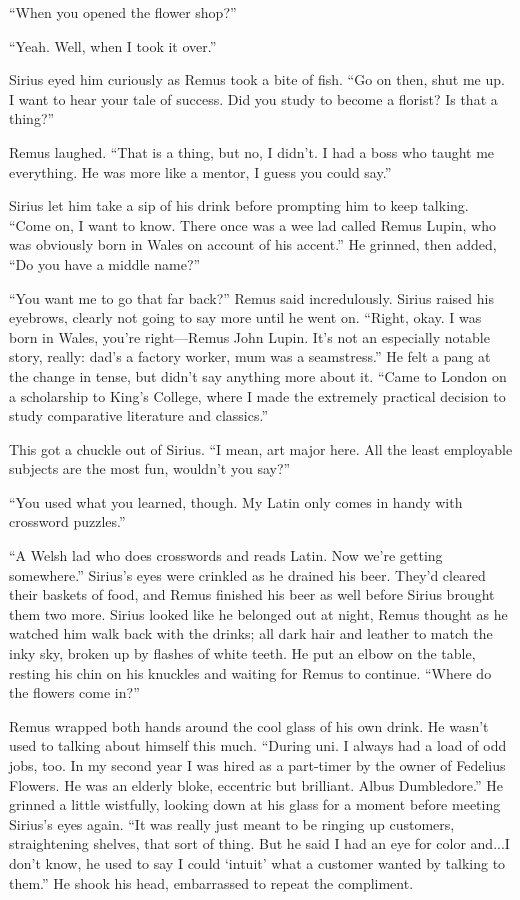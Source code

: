 “When you opened the flower shop?”

“Yeah. Well, when I took it over.”

Sirius eyed him curiously as Remus took a bite of fish. “Go on then, shut me up. I want to hear your tale of success. Did you study to become a florist? Is that a thing?”

Remus laughed. “That is a thing, but no, I didn’t. I had a boss who taught me everything. He was more like a mentor, I guess you could say.”

Sirius let him take a sip of his drink before prompting him to keep talking. “Come on, I want to know. There once was a wee lad called Remus Lupin, who was obviously born in Wales on account of his accent.” He grinned, then added, “Do you have a middle name?”

“You want me to go that far back?” Remus said incredulously. Sirius raised his eyebrows, clearly not going to say more until he went on. “Right, okay. I was born in Wales, you’re right—Remus John Lupin. It’s not an especially notable story, really: dad’s a factory worker, mum was a seamstress.” He felt a pang at the change in tense, but didn’t say anything more about it. “Came to London on a scholarship to King’s College, where I made the extremely practical decision to study comparative literature and classics.”

This got a chuckle out of Sirius. “I mean, art major here. All the least employable subjects are the most fun, wouldn’t you say?”

“You used what you learned, though. My Latin only comes in handy with crossword puzzles.”

“A Welsh lad who does crosswords and reads Latin. Now we’re getting somewhere.” Sirius’s eyes were crinkled as he drained his beer. They’d cleared their baskets of food, and Remus finished his beer as well before Sirius brought them two more. Sirius looked like he belonged out at night, Remus thought as he watched him walk back with the drinks; all dark hair and leather to match the inky sky, broken up by flashes of white teeth. He put an elbow on the table, resting his chin on his knuckles and waiting for Remus to continue. “Where do the flowers come in?”

Remus wrapped both hands around the cool glass of his own drink. He wasn’t used to talking about himself this much. “During uni. I always had a load of odd jobs, too. In my second year I was hired as a part-timer by the owner of Fedelius Flowers. He was an elderly bloke, eccentric but brilliant. Albus Dumbledore.” He grinned a little wistfully, looking down at his glass for a moment before meeting Sirius’s eyes again. “It was really just meant to be ringing up customers, straightening shelves, that sort of thing. But he said I had an eye for color and...I don’t know, he used to say I could ‘intuit’ what a customer wanted by talking to them.” He shook his head, embarrassed to repeat the compliment.

